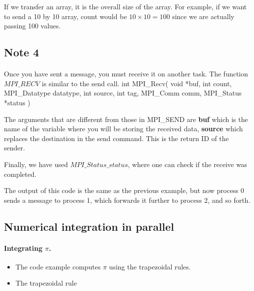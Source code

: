 \documentclass[%
twoside,                 %
final,                   %
10pt]{article}
\begin{document}
{If we transfer an array, it is  the overall size of the array. 
For example, if we want to send a 10 by 10 array, count would be $10\times 10=100$ 
since we are  actually passing 100 values.




\subsection{Note 4}

\paragraph{}

Once you have  sent a message, you must receive it on another task. The function $MPI\_RECV$
is similar to the send call.
\bcppcod
int MPI_Recv( void *buf, int count, MPI_Datatype datatype, 
            int source, 
            int tag, MPI_Comm comm, MPI_Status *status )
\ecppcod

The arguments that are different from those in MPI\_SEND are
\textbf{buf} which  is the name of the variable where you will  be storing the received data, 
\textbf{source} which  replaces the destination in the send command. This is the return ID of the sender.

Finally,  we have used  $MPI\_Status\_status$,  
where one can check if the receive was completed.

The output of this code is the same as the previous example, but now
process 0 sends a message to process 1, which forwards it further
to process 2, and so forth.



\subsection{Numerical integration in parallel}

\paragraph{Integrating $\pi$.}

\begin{itemize}
\item The code example computes $\pi$ using the trapezoidal rules.

\item The trapezoidal rule
\end{itemize}

}
\end{document}
